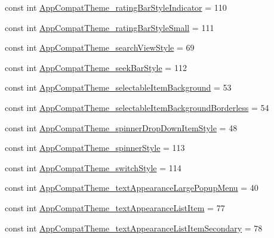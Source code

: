 \begin{DoxyCompactItemize}
\item 
const int \mbox{\hyperlink{class_f_w_p_s___app_1_1_droid_1_1_resource_1_1_styleable_a4f2c5b30bc1d329863060afd756a7dc4}{App\+Compat\+Theme\+\_\+rating\+Bar\+Style\+Indicator}} = 110
\item 
const int \mbox{\hyperlink{class_f_w_p_s___app_1_1_droid_1_1_resource_1_1_styleable_a0e8968d389759729af4c6b367c3fc922}{App\+Compat\+Theme\+\_\+rating\+Bar\+Style\+Small}} = 111
\item 
const int \mbox{\hyperlink{class_f_w_p_s___app_1_1_droid_1_1_resource_1_1_styleable_a2cabef28622fa531ba0790293c950470}{App\+Compat\+Theme\+\_\+search\+View\+Style}} = 69
\item 
const int \mbox{\hyperlink{class_f_w_p_s___app_1_1_droid_1_1_resource_1_1_styleable_a2c6c250e2825a54487e11eed89fb0657}{App\+Compat\+Theme\+\_\+seek\+Bar\+Style}} = 112
\item 
const int \mbox{\hyperlink{class_f_w_p_s___app_1_1_droid_1_1_resource_1_1_styleable_a9bd8273158dbdc81b032e16a1b41f19f}{App\+Compat\+Theme\+\_\+selectable\+Item\+Background}} = 53
\item 
const int \mbox{\hyperlink{class_f_w_p_s___app_1_1_droid_1_1_resource_1_1_styleable_ad677cf375e03961171f5bde59182c538}{App\+Compat\+Theme\+\_\+selectable\+Item\+Background\+Borderless}} = 54
\item 
const int \mbox{\hyperlink{class_f_w_p_s___app_1_1_droid_1_1_resource_1_1_styleable_a27691de89ba5e9a02bad099e51c9113a}{App\+Compat\+Theme\+\_\+spinner\+Drop\+Down\+Item\+Style}} = 48
\item 
const int \mbox{\hyperlink{class_f_w_p_s___app_1_1_droid_1_1_resource_1_1_styleable_ad60948db60912193e5440fa424a39f4f}{App\+Compat\+Theme\+\_\+spinner\+Style}} = 113
\item 
const int \mbox{\hyperlink{class_f_w_p_s___app_1_1_droid_1_1_resource_1_1_styleable_a9c0260f3b1353d96e8f23e53040e0e10}{App\+Compat\+Theme\+\_\+switch\+Style}} = 114
\item 
const int \mbox{\hyperlink{class_f_w_p_s___app_1_1_droid_1_1_resource_1_1_styleable_a630350079b65cedea372fa8f15166e64}{App\+Compat\+Theme\+\_\+text\+Appearance\+Large\+Popup\+Menu}} = 40
\item 
const int \mbox{\hyperlink{class_f_w_p_s___app_1_1_droid_1_1_resource_1_1_styleable_af58922c93c4122974f2232a6ff8d5dbc}{App\+Compat\+Theme\+\_\+text\+Appearance\+List\+Item}} = 77
\item 
const int \mbox{\hyperlink{class_f_w_p_s___app_1_1_droid_1_1_resource_1_1_styleable_a456fb53b04237326f78ff2cf67fae725}{App\+Compat\+Theme\+\_\+text\+Appearance\+List\+Item\+Secondary}} = 78

\end{DoxyCompactItemize}
